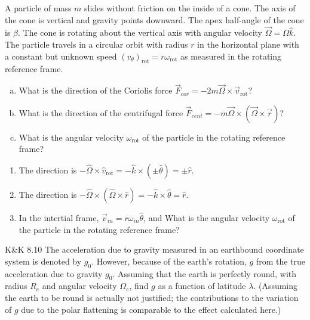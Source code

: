 \documentclass{esg8012pset}
\begin{document}
\begin{problem}{}
  A particle of mass $m$ slides without friction on the inside of a cone. The axis of the cone is vertical and gravity points downward. The apex half-angle of the cone is $\beta$. The cone is rotating about the vertical axis with angular velocity $\vec \Omega = \Omega \hat k$.  The particle travels in a circular orbit with radius $r$ in the horizontal plane with a constant but unknown speed $(v_\theta)_\text{rot} = r\omega_\text{rot}$ as measured in the rotating reference frame.
  \begin{enumerate}[(a)]
    \item What is the direction of the Coriolis force $\vec F_{cor} = -2 m \vec \Omega \times \vec v_\text{rot}$?
    \item What is the direction of the centrifugal force $\vec F_{cent} = -m \vec \Omega \times (\vec \Omega \times \vec r)$?
    \item What is the angular velocity $\omega_\text{rot}$ of the particle in the rotating reference frame?
  \end{enumerate}
\end{problem}
\begin{solution}
\begin{enumerate}
  \item The direction is $-\hat \Omega \times \hat v_\text{rot} = -\hat k \times (\pm \hat\theta) = \pm \hat r$.
  \item The direction is $-\hat \Omega \times(\hat\Omega\times\hat r) = -\hat k \times\hat \theta = \hat r$.
  \item In the intertial frame, $\vec v_{in} = r\omega_{in}\hat\theta$, and  What is the angular velocity $\omega_\text{rot}$ of the particle in the rotating reference frame?
\end{enumerate}
\end{solution}






\begin{problem}{K\&K 8.10}
  The acceleration due to gravity measured in an earthbound coordinate system is denoted by $g_0$. However, because of the earth's rotation, $g$ from the true acceleration due to gravity $g_0$. Assuming that the earth is perfectly round, with radius $R_e$ and angular velocity $\Omega_e$, find $g$ as a function of latitude $\lambda$. (Assuming the earth to be round is actually not justified; the contributions to the variation of $g$ due to the polar flattening is comparable to the effect calculated here.)
\end{problem}
\begin{solution}
\end{solution}
\end{document}
